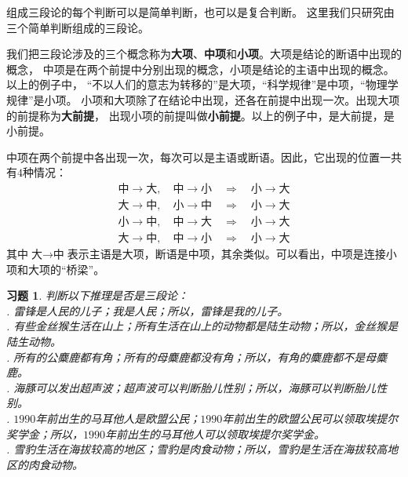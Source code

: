 \documentclass[12pt,UTF8]{ctexbook}
\newtheorem{xt}{习题}[section]
\begin{document}
组成三段论的每个判断可以是简单判断，也可以是复合判断。
这里我们只研究由三个简单判断组成的三段论。

我们把三段论涉及的三个概念称为\textbf{大项}、\textbf{中项}和\textbf{小项}。大项是结论的断语中出现的概念，
中项是在两个前提中分别出现的概念，小项是结论的主语中出现的概念。以上的例子中，
“不以人们的意志为转移的”是大项，“科学规律”是中项，“物理学规律”是小项。
小项和大项除了在结论中出现，还各在前提中出现一次。出现大项的前提称为\textbf{大前提}，
出现小项的前提叫做\textbf{小前提}。以上的例子中，是大前提，是小前提。

中项在两个前提中各出现一次，每次可以是主语或断语。因此，它出现的位置一共有$4$种情况：
\begin{align*}
    \mbox{中} \rightarrow \mbox{大}, \quad \mbox{中} \rightarrow \mbox{小} \quad \Rightarrow \quad \mbox{小} \rightarrow \mbox{大}  \\
    \mbox{大} \rightarrow \mbox{中}, \quad \mbox{小} \rightarrow \mbox{中} \quad \Rightarrow \quad \mbox{小} \rightarrow \mbox{大}  \\
    \mbox{小} \rightarrow \mbox{中}, \quad \mbox{中} \rightarrow \mbox{大} \quad \Rightarrow \quad \mbox{小} \rightarrow \mbox{大}  \\
    \mbox{大} \rightarrow \mbox{中}, \quad \mbox{中} \rightarrow \mbox{小} \quad \Rightarrow \quad \mbox{小} \rightarrow \mbox{大} 
\end{align*}
其中$\mbox{大} \rightarrow \mbox{中}$表示主语是大项，断语是中项，其余类似。可以看出，中项是连接小项和大项的“桥梁”。

\begin{xt}\label{xt:4-0-10}
    判断以下推理是否是三段论：\\
    . 雷锋是人民的儿子；我是人民；所以，雷锋是我的儿子。\\
    . 有些金丝猴生活在山上；所有生活在山上的动物都是陆生动物；所以，金丝猴是陆生动物。\\
    . 所有的公麋鹿都有角；所有的母麋鹿都没有角；所以，有角的麋鹿都不是母麋鹿。\\
    . 海豚可以发出超声波；超声波可以判断胎儿性别；所以，海豚可以判断胎儿性别。\\
    . $1990$年前出生的马耳他人是欧盟公民；$1990$年前出生的欧盟公民可以领取埃提尔奖学金；所以，$1990$年前出生的马耳他人可以领取埃提尔奖学金。\\
    . 雪豹生活在海拔较高的地区；雪豹是肉食动物；所以，雪豹是生活在海拔较高地区的肉食动物。
\end{xt}
\end{document}

